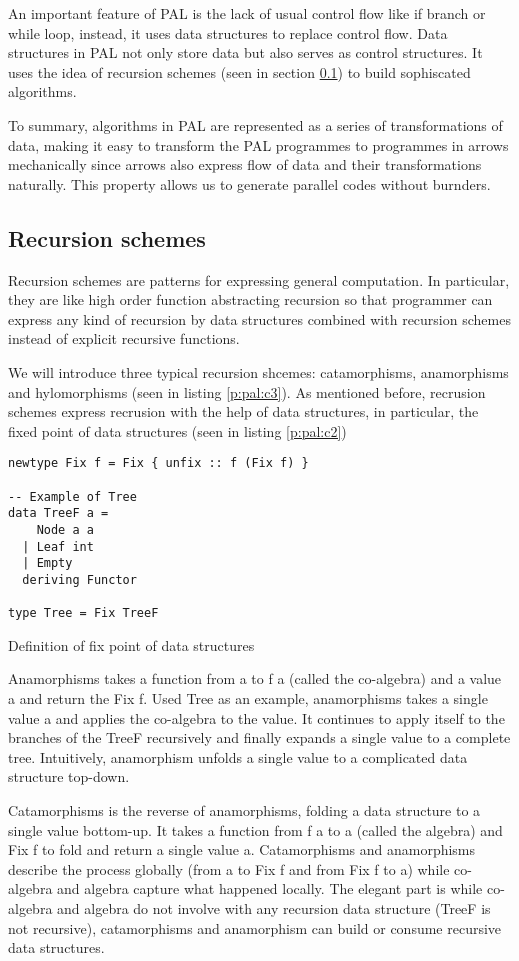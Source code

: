 An important feature of PAL is the lack of usual control flow like if branch or while loop, instead, it uses data structures to replace control flow. Data structures in PAL not only store data but also serves as control structures. It uses the idea of recursion schemes (seen in section \ref{p:pal:rs}) to build sophiscated algorithms. 

To summary, algorithms in PAL are represented as a series of transformations of data, making it easy to transform the PAL programmes to programmes in arrows mechanically since arrows also express flow of data and their transformations naturally. This property allows us to generate parallel codes without burnders.
\subsection{Recursion schemes} \label{p:pal:rs}
Recursion schemes are patterns for expressing general computation. In particular, they are like high order function abstracting recursion so that programmer can express any kind of recursion by data structures combined with recursion schemes instead of explicit recursive functions.

We will introduce three typical recursion shcemes: catamorphisms, anamorphisms and hylomorphisms (seen in listing \ref{p:pal:c3}). As mentioned before, recrusion schemes express recrusion with the help of data structures, in particular, the fixed point of data structures (seen in listing \ref{p:pal:c2})
\begin{listing}[ht]
\begin{verbatim}
newtype Fix f = Fix { unfix :: f (Fix f) }

-- Example of Tree
data TreeF a =
    Node a a
  | Leaf int
  | Empty
  deriving Functor

type Tree = Fix TreeF
\end{verbatim}
\caption{Definition of fix point of data structures} \label{p:pal:c2}
\end{listing}

Anamorphisms takes a function from a to f a (called the co-algebra) and a value a and return the Fix f. Used Tree as an example, anamorphisms takes a single value a and applies the co-algebra to the value. It continues to apply itself to the branches of the TreeF recursively and finally expands a single value to a complete tree. Intuitively, anamorphism unfolds a single value to a complicated data structure top-down.

Catamorphisms is the reverse of anamorphisms, folding a data structure to a single value bottom-up. It takes a function from f a to a (called the algebra) and Fix f to fold and return a single value a. Catamorphisms and anamorphisms describe the process globally (from a to Fix f and from Fix f to a) while co-algebra and algebra capture what happened locally. The elegant part is while co-algebra and algebra do not involve with any recursion data structure (TreeF is not recursive), catamorphisms and anamorphism can build or consume recursive data structures.

